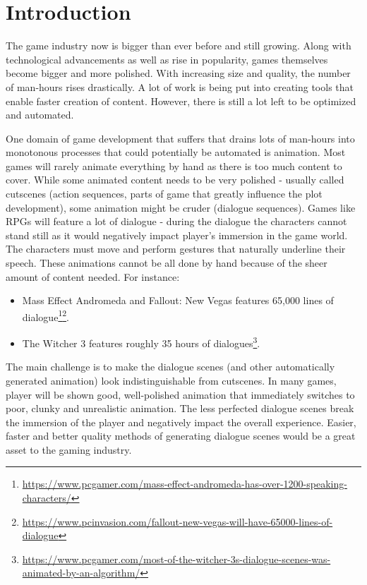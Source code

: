 \chapter{Introduction\label{chap:introduction}}

The game industry now is bigger than ever before and still growing. Along with technological advancements as well as rise in popularity, games themselves become bigger and more polished. With increasing size and quality, the number of man-hours rises drastically. A lot of work is being put into creating tools that enable faster creation of content. However, there is still a lot left to be optimized and automated.

One domain of game development that suffers that drains lots of man-hours into monotonous processes that could potentially be automated is animation. Most games will rarely animate everything by hand as there is too much content to cover. While some animated content needs to be very polished - usually called cutscenes (action sequences, parts of game that greatly influence the plot development), some animation might be cruder (dialogue sequences). Games like RPGs will feature a lot of dialogue - during the dialogue the characters cannot stand still as it would negatively impact player's immersion in the game world. The characters must move and perform gestures that naturally underline their speech. These animations cannot be all done by hand because of the sheer amount of content needed. For instance:

\begin{itemize}
	\item Mass Effect Andromeda and Fallout:  New Vegas features 65,000 lines of dialogue\footnote{\url{https://www.pcgamer.com/mass-effect-andromeda-has-over-1200-speaking-characters/}}\footnote{\url{https://www.pcinvasion.com/fallout-new-vegas-will-have-65000-lines-of-dialogue}}.
	
	\item The Witcher 3 features roughly 35 hours of dialogues\footnote{\url{https://www.pcgamer.com/most-of-the-witcher-3s-dialogue-scenes-was-animated-by-an-algorithm/}}.
	
\end{itemize}

The main challenge is to make the dialogue scenes (and other automatically generated animation) look indistinguishable from cutscenes. In many games, player will be shown good, well-polished animation that immediately switches to poor, clunky and unrealistic animation. The less perfected dialogue scenes break the immersion of the player and negatively impact the overall experience. Easier, faster and better quality methods of generating dialogue scenes would be a great asset to the gaming industry.


